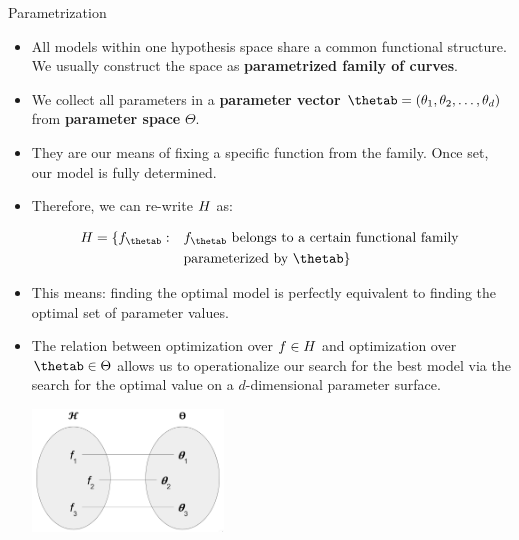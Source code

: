\documentclass[11pt,compress,t,notes=noshow, xcolor=table]{beamer}
\begin{document}
\begin{vbframe}{Parametrization}

\begin{itemize}
  
  \item All models within one hypothesis space share a common functional 
  structure. We usually construct the space as 
  \textbf{parametrized family of curves}.
  
  
  \item We collect all parameters in a \textbf{parameter vector} 
  $\thetab = (\theta_1, \theta_2, \ldots, \theta_d)$ from \textbf{parameter space} 
  $\Theta$.
  
  \item They are our means of fixing a specific function from the family. 
      Once set, our model is fully determined.
  
  \item Therefore, we can re-write $H$ as:

  \begin{equation*}
    \begin{split}
      \Hspace = \{f_{\thetab}: \quad & f_{\thetab} \text{ belongs to a certain
       functional family } \\
       & \text{parameterized by } \thetab\}
    \end{split}
  \end{equation*}
  
  
  \framebreak
  
  \item This means: finding the optimal model is perfectly equivalent to 
  finding the optimal set of parameter values.
  
  \item The relation between optimization over $f \in H$ and 
  optimization over $\thetab \in \Theta$ allows us to operationalize our search
  for the best model via the search for the optimal value on a $d$-dimensional
  parameter surface.
  
  \begin{center}
    \includegraphics[width = 0.4\textwidth]{figure_man/bijection_f_theta.PNG} 
  \end{center}
  

\end{itemize}
\end{vbframe}
\end{document}
